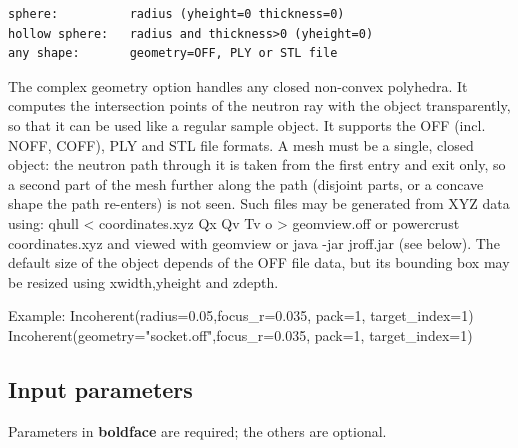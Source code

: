 \begin{verbatim}
sphere:          radius (yheight=0 thickness=0)
hollow sphere:   radius and thickness>0 (yheight=0)
any shape:       geometry=OFF, PLY or STL file
\end{verbatim}

The complex geometry option handles any closed non-convex polyhedra. It computes the intersection points of the neutron ray with the object transparently, so that it can be used like a regular sample object. It supports the OFF (incl. NOFF, COFF), PLY and STL file formats. A mesh must be a single, closed object: the neutron path through it is taken from the first entry and exit only, so a second part of the mesh further along the path (disjoint parts, or a concave shape the path re-enters) is not seen. Such files may be generated from XYZ data using: qhull \textless{} coordinates.xyz Qx Qv Tv o \textgreater{} geomview.off or powercrust coordinates.xyz and viewed with geomview or java -jar jroff.jar (see below). The default size of the object depends of the OFF file data, but its bounding box may be resized using xwidth,yheight and zdepth.

Example: Incoherent(radius=0.05,focus\_r=0.035, pack=1, target\_index=1) Incoherent(geometry="socket.off",focus\_r=0.035, pack=1, target\_index=1)

\subsection*{Input parameters}
Parameters in \textbf{boldface} are required; the others are optional.


